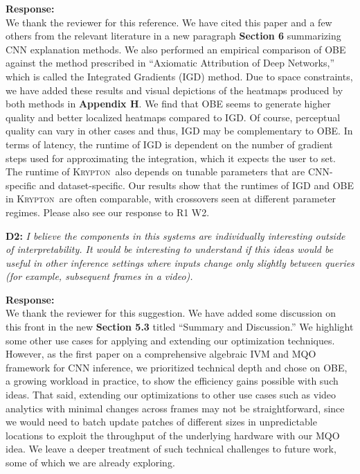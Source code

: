 \documentclass[preprint]{vldb}
\newcommand{\system}{\textsc{Krypton}}
\begin{document}
\vspace{2mm}
\noindent \textbf{Response:} \\
We thank the reviewer for this reference. We have cited this paper and a few others from the relevant literature in a new paragraph \textbf{Section 6} summarizing CNN explanation methods. We also performed an empirical comparison of OBE against the method prescribed in ``Axiomatic Attribution of Deep Networks,'' which is called the Integrated Gradients (IGD) method. Due to space constraints, we have added these results and visual depictions of the heatmaps produced by both methods in \textbf{Appendix H}. We find that OBE seems to generate higher quality and better localized heatmaps compared to IGD. Of course, perceptual quality can vary in other cases and thus, IGD may be complementary to OBE. In terms of latency, the runtime of IGD is dependent on the number of gradient steps used for approximating the integration, which it expects the user to set.  The runtime of \system ~also depends on tunable parameters that are CNN-specific and dataset-specific. Our results show that the runtimes of IGD and OBE in \system ~are often comparable, with crossovers seen at different parameter regimes. Please also see our response to R1 W2. 

\vspace{2mm}
\noindent \textbf{D2:} \textit{I believe the components in this systems are individually interesting outside of interpretability. It would be interesting to understand if this ideas would be useful in other inference settings where inputs change only slightly between queries (for example, subsequent frames in a video).}

\vspace{2mm}
\noindent \textbf{Response:} \\
We thank the reviewer for this suggestion. We have added some discussion on this front in the new \textbf{Section 5.3} titled ``Summary and Discussion.'' We highlight some other use cases for applying and extending our optimization techniques. However, as the first paper on a comprehensive algebraic IVM and MQO framework for CNN inference, we prioritized technical depth and chose on OBE, a growing workload in practice, to show the efficiency gains possible with such ideas. That said, extending our optimizations to other use cases such as video analytics with minimal changes across frames may not be straightforward, since we would need to batch update patches of different sizes in unpredictable locations to exploit the throughput of the underlying hardware with our MQO idea. We leave a deeper treatment of such technical challenges to future work, some of which we are already exploring.
\end{document}
